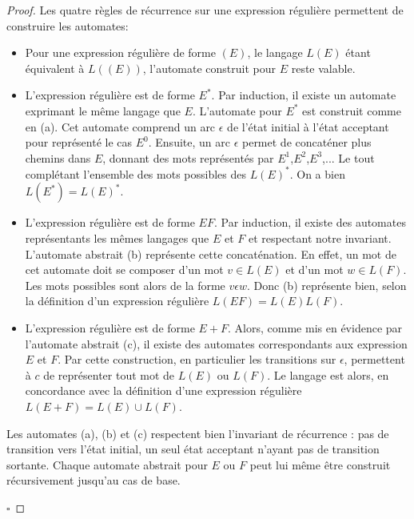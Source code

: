 \begin{proof}
	Les quatre règles de récurrence sur une expression régulière permettent de construire les automates:
	\begin{itemize}
		\item Pour une expression régulière de forme $(E)$, le langage $L(E)$ étant équivalent à $L((E))$, l'automate construit pour $E$ reste valable.
		\item L'expression régulière est de forme $E^*$. Par induction, il existe un automate exprimant le même langage que $E$. L'automate pour $E^*$ est construit comme en (a). Cet automate comprend un arc $\epsilon$ de l'état initial à l'état acceptant pour représenté le cas $E^0$. Ensuite, un arc $\epsilon$ permet de concaténer plus chemins dans $E$, donnant des mots représentés par $E^1$,$E^2$,$E^3$,... Le tout complétant l'ensemble des mots possibles des $L(E)^*$. On a bien $L(E^*)=L(E)^*$.
		\item L'expression régulière est de forme $EF$. Par induction, il existe des automates représentants les mêmes langages que $E$ et $F$ et respectant notre invariant. L'automate abstrait (b) représente cette concaténation. En effet, un mot de cet automate doit se composer d'un mot $v\in L(E)$ et d'un mot $w \in L(F)$. Les mots possibles sont alors de la forme $v\epsilon w$. Donc (b) représente bien, selon la définition d'un expression régulière $L(EF)=L(E)L(F)$.
		\item L'expression régulière est de forme $E+F$. Alors, comme mis en évidence par l'automate abstrait (c), il existe des automates correspondants aux expression $E$ et $F$. Par cette construction, en particulier les transitions sur $\epsilon$, permettent à $c$ de représenter tout mot de $L(E)$ ou $L(F)$. Le langage est alors, en concordance avec la définition d'une expression régulière $L(E+F)=L(E)\cup L(F)$.
	\end{itemize}

	Les automates (a), (b) et (c) respectent bien l'invariant de récurrence : pas de transition vers l'état initial, un seul état acceptant n'ayant pas de transition sortante. Chaque automate abstrait pour $E$ ou $F$ peut lui même être construit récursivement jusqu'au cas de base.

	\hfill$\square$
\end{proof}
